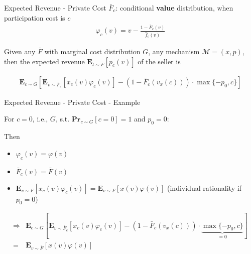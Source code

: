 \documentclass{beamer}
\begin{document}
\begin{frame}{Expected Revenue - Private Cost}
  $\bar{F}_c$: conditional \textbf{value} distribution, when participation cost is $c$
  \begin{align*}
    \varphi_c(v) = v - \frac{1- \bar{F}_c(v)}{\hat{f}_c(v)}
  \end{align*}

  \begin{theorem}
    Given any $\bar{F}$ with marginal cost distribution $G$, any mechanism $\mathcal{M}=(x,p)$, then the expected revenue $\mathbf{E}_{t \sim \bar{F}}\left[p_c(v)\right]$ of the seller is

    \begin{align*}
      \mathbf{E}_{c \sim G}\left[\mathbf{E}_{v\sim\bar{F}_c}\left[x_c(v)\varphi_c(v)\right] - (1-\bar{F}_c(v_x(c))) \cdot \max\{-p_0,c\}\right]
    \end{align*}
  \end{theorem}
\end{frame}

\begin{frame}{Expected Revenue - Private Cost - Example}
  \begin{example}
    For $c = 0$, i.e., $G$, s.t. $\mathbf{Pr}_{c \sim G}[c = 0] = 1$ and $p_0 = 0$:
  \end{example}

  Then
  \begin{itemize}
    \item $\varphi_c(v) = \varphi(v)$
    \item $\bar{F}_c(v) = \bar{F}(v)$
    \item $\mathbf{E}_{v \sim F}\left[x_c(v) \varphi_c(v)\right] = \mathbf{E}_{v \sim F}\left[x(v) \varphi(v)\right]$
          (individual rationality if $p_0 = 0$)
  \end{itemize}

  \begin{align*}
    \Rightarrow & \mathbf{E}_{c \sim G}\left[\mathbf{E}_{v\sim\bar{F}_c}\left[x_c(v)\varphi_c(v)\right] - (1-\bar{F}_c(v_x(c))) \cdot \underbrace{\max\{-p_0,c\}}_{=0}\right] \\
    =           & \mathbf{E}_{v \sim \bar{F}}\left[x(v) \varphi(v)\right]
  \end{align*}
\end{frame}
\end{document}
